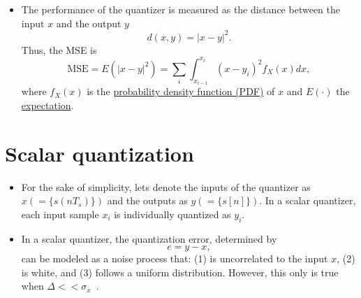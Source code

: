 \begin{itemize}
\item The performance of the quantizer is measured as the distance
  between the input $x$ and the output $y$
  \begin{equation*}
    d(x,y) = |x-y|^2.
  \end{equation*}
  Thus, the MSE is
  \begin{equation}
    \text{MSE} = E(|x-y|^2)=\sum_i\int_{x_{i-1}}^{x_i} (x-y_i)^2f_X(x)dx,
  \end{equation}
  where $f_X(x)$ is the
  \href{https://en.wikipedia.org/wiki/Probability_density_function}{probability
    density function (PDF)} of $x$ and $E(\cdot)$ the
  \href{https://en.wikipedia.org/wiki/Expected_value}{expectation}.

\end{itemize}

\section{Scalar quantization}
\begin{itemize}
\item For the sake of simplicity, lets denote the inputs of the
  quantizer as $x (=\{s(nT_s)\})$ and the outputs as $y
  (=\{s[n]\})$. In a scalar quantizer, each input sample $x_i$ is
  individually quantized as $y_i$.
  
\item In a scalar quantizer, the quantization error, determined by
  \begin{equation*}
    e=y-x,
  \end{equation*}
  can be modeled as a noise process that: (1) is uncorrelated to the
  input $x$, (2) is white, and (3) follows a uniform
  distribution. However, this only is true when
  $\Delta<<\sigma_x$~\cite{vetterli1995wavelets}.

\end{itemize}

